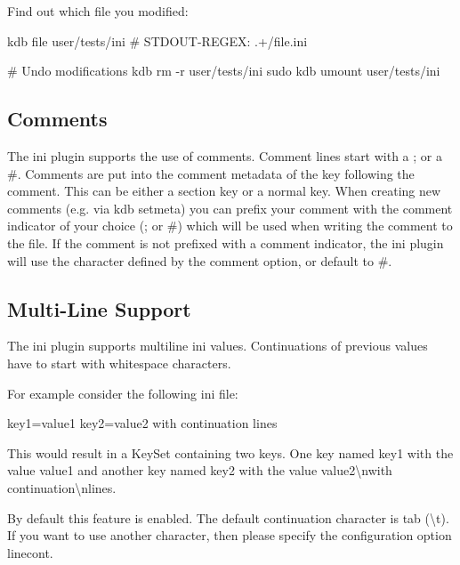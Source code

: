 Find out which file you modified\+:


\begin{DoxyCode}
kdb file user/tests/ini
# STDOUT-REGEX: .+/file.ini

# Undo modifications
kdb rm -r user/tests/ini
sudo kdb umount user/tests/ini
\end{DoxyCode}


\subsection*{Comments}

The ini plugin supports the use of comments. Comment lines start with a \textquotesingle{};\textquotesingle{} or a \textquotesingle{}\#\textquotesingle{}. Comments are put into the comment metadata of the key following the comment. This can be either a section key or a normal key. When creating new comments (e.\+g. via {\ttfamily kdb setmeta}) you can prefix your comment with the comment indicator of your choice (\textquotesingle{};\textquotesingle{} or \textquotesingle{}\#\textquotesingle{}) which will be used when writing the comment to the file. If the comment is not prefixed with a comment indicator, the ini plugin will use the character defined by the {\ttfamily comment} option, or default to \textquotesingle{}\#\textquotesingle{}.

\subsection*{Multi-\/\+Line Support}

The ini plugin supports multiline ini values. Continuations of previous values have to start with whitespace characters.

For example consider the following ini file\+:


\begin{DoxyCode}
key1=value1
key2=value2
        with continuation
        lines
\end{DoxyCode}


This would result in a Key\+Set containing two keys. One key named {\ttfamily key1} with the value {\ttfamily value1} and another key named {\ttfamily key2} with the value {\ttfamily value2\textbackslash{}nwith continuation\textbackslash{}nlines}.

By default this feature is enabled. The default continuation character is tab ({\ttfamily \textbackslash{}t}). If you want to use another character, then please specify the configuration option {\ttfamily linecont}.

